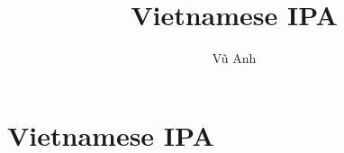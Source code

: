\documentclass{article}
\title{Vietnamese IPA}
\author{Vũ Anh}
\begin{document}
\maketitle
\section{Vietnamese IPA}
\begin{minipage}[position]{20pt}
\begin{center}
\begin{longtable}{| c | c | c |}
\hline
\hline
\end{longtable}
\end{center}
\end{minipage}
\end{document}
